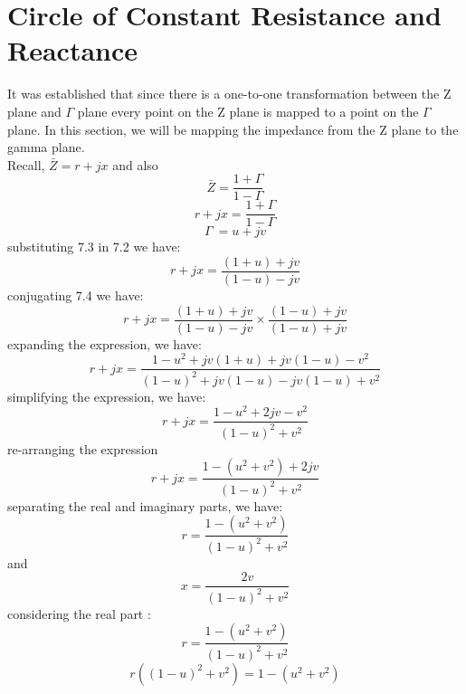 \section{Circle of Constant Resistance and Reactance}
It was established that since there is a one-to-one transformation between the Z plane and $\Gamma$ plane every point on the Z plane is mapped to a point on the $ \Gamma$ plane. In this section, we will be mapping the impedance from the Z plane to the gamma plane.\\
Recall,
$ \bar{Z}= r + jx $ and also
\begin{equation}
\bar{Z}= \frac{1 + \Gamma}{1 - \Gamma}
\end{equation}
\begin{equation}
r + jx =\frac{1 + \Gamma}{1 - \Gamma}
\end{equation}
\begin{equation}
\Gamma\ = u + jv
\end{equation}
substituting 7.3 in 7.2 we have:
\begin{equation}
r + jx = \frac{(1 + u) + jv}{(1 - u) -jv}
\end{equation}
conjugating 7.4 we have:
\begin{equation*}
r + jx = \frac{(1 + u) + jv}{(1 - u) -jv}\times \frac{(1 - u) + jv}{(1 - u) +jv}
\end{equation*}
expanding the expression, we have:
\begin{equation*}
r + jx =\frac{1 - u^2 + jv(1 + u) + jv(1 - u) - v^2}{(1 - u)^2 + jv(1 - u) - jv(1 - u) + v^2} 
\end{equation*}
simplifying the expression, we have:
\begin{equation*}
r + jx = \frac{1 - u^2 + 2jv - v^2}{(1 -u)^2 + v^2}
\end{equation*}
re-arranging the expression
\begin{equation*}
r + jx = \frac{1 - (u^2 + v^2) + 2jv}{(1 - u)^2 + v^2}
\end{equation*}
separating the real and imaginary parts, we have:
\begin{equation}
r = \frac{1 - (u^2 + v^2)}{(1 - u)^2 + v^2}
\end{equation}
and
\begin{equation}
x = \frac{2v}{(1 - u)^2 + v^2}
\end{equation}
considering the real part :	
\begin{equation*}
r = \frac{1 - (u^2 + v^2)}{(1 - u)^2 + v^2}
\end{equation*}
\begin{equation*}
r((1 - u)^2 + v^2) = 1 -(u^2 + v^2)
\end{equation*}
